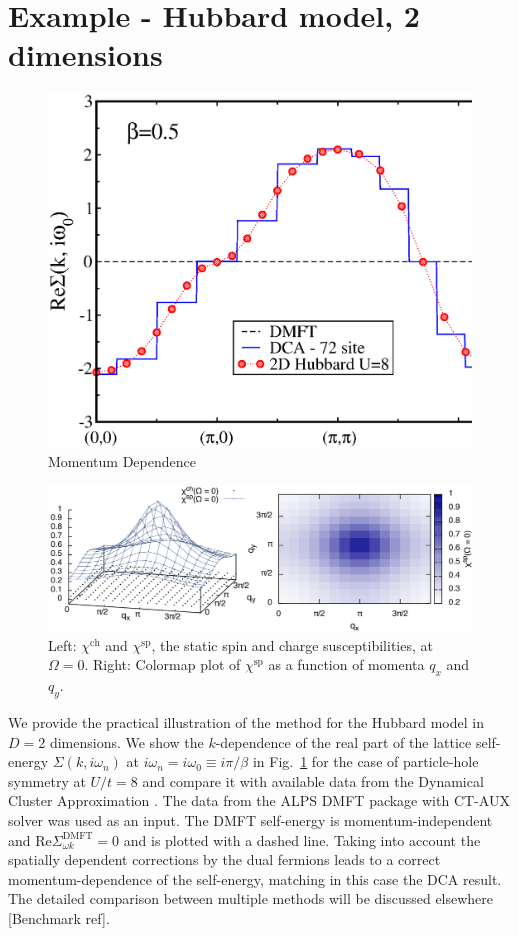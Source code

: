\documentclass[3p,times,procedia]{elsarticle}
\begin{document}
\section{Example - Hubbard model, 2 dimensions}

\begin{figure}[ht]
\centering
\includegraphics[width=0.6\columnwidth]{DF_U12.eps}
\caption{Momentum Dependence}
\label{fig:sigma}
\end{figure}

\begin{figure}[ht]
\centering
\includegraphics[width=\columnwidth]{susc.pdf}
\caption{Left: $\chi^{\mathrm{ch}}$ and $\chi^{\mathrm{sp}}$, the static spin and charge susceptibilities, at $\Omega = 0$. Right: Colormap plot of $\chi^{\mathrm{sp}}$ as a function of momenta $q_x$ and $q_y$. }
\label{fig:susc}
\end{figure}

We provide the practical illustration of the method for the Hubbard model in $D=2$ dimensions. We show the $k$-dependence of the real part of the lattice self-energy $\Sigma(k, i\omega_n)$ at $i\omega_n=i\omega_0 \equiv i\pi/\beta$ in Fig.~\ref{fig:sigma} for the case of particle-hole symmetry at $U/t=8$ and compare it with available data from the Dynamical Cluster Approximation \cite{MaierJarrell:2005}. The data from the ALPS DMFT \cite{ALPS2} package with CT-AUX solver \cite{Gull2008b} was used as an input. The DMFT self-energy is momentum-independent and $\mathrm{Re} \Sigma_{\omega k}^{\mathrm{DMFT}} = 0$ and is plotted with a dashed line. Taking into account the spatially dependent corrections by the dual fermions leads to a correct momentum-dependence of the self-energy, matching in this case the DCA result. The detailed comparison between multiple methods will be discussed elsewhere [Benchmark ref]. 
\end{document}
